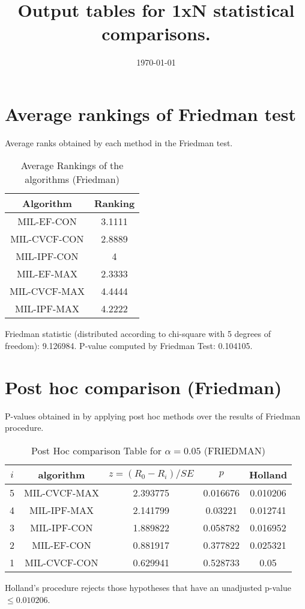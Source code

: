 \documentclass[a4paper,10pt]{article}
\title{Output tables for 1xN statistical comparisons.}
\author{}
\date{\today}
\begin{document}
\begin{landscape}
\pagestyle{empty}
\maketitle
\thispagestyle{empty}

\section{Average rankings of Friedman test}


Average ranks obtained by each method in the Friedman test.

\begin{table}[!htp]
\centering
\begin{tabular}{|c|c|}\hline
Algorithm&Ranking\\\hline
MIL-EF-CON&3.1111\\MIL-CVCF-CON&2.8889\\MIL-IPF-CON&4\\MIL-EF-MAX&2.3333\\MIL-CVCF-MAX&4.4444\\MIL-IPF-MAX&4.2222\\\hline\end{tabular}
\caption{Average Rankings of the algorithms (Friedman)}
\end{table}

Friedman statistic (distributed according to chi-square with 5 degrees of freedom): 9.126984. \newline P-value computed by Friedman Test: 0.104105.\newline


\newpage

\section{Post hoc comparison (Friedman)}


P-values obtained in by applying post hoc methods over the results of Friedman procedure.

\begin{table}[!htp]
\centering\footnotesize
\begin{tabular}{ccccc}
$i$&algorithm&$z=(R_0 - R_i)/SE$&$p$&Holland\\
\hline5&MIL-CVCF-MAX&2.393775&0.016676&0.010206\\4&MIL-IPF-MAX&2.141799&0.03221&0.012741\\3&MIL-IPF-CON&1.889822&0.058782&0.016952\\2&MIL-EF-CON&0.881917&0.377822&0.025321\\1&MIL-CVCF-CON&0.629941&0.528733&0.05\\\hline
\end{tabular}
\caption{Post Hoc comparison Table for $\alpha=0.05$ (FRIEDMAN)}
\end{table}Holland's procedure rejects those hypotheses that have an unadjusted p-value $\le0.010206$.



\end{landscape}
\end{document}
